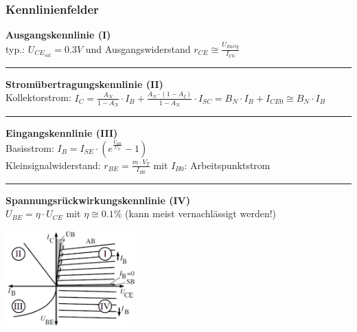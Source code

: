         \subsubsection{Kennlinienfelder}
            \begin{minipage}[T]{14cm}
                {\bf Ausgangskennlinie (I)}\\
                typ.: $U_{CE_{sat}}=0.3V$ und Ausgangswiderstand $r_{CE} \cong \frac{U_{Early}}{I_{C0}}$\\
                \hrule\vspace{1mm}
                {\bf Strom\"ubertragungskennlinie (II)}\\
                Kollektorstrom: $I_C = \frac{A_N}{1-A_N}\cdot I_B + \frac{A_N\cdot (1-A_I)}{1-A_N}\cdot I_{SC} = B_N\cdot I_B + I_{CE0} \cong B_N\cdot I_B$\\
                \hrule\vspace{1mm}
                {\bf Eingangskennlinie (III)}\\
                Basisstrom: $I_B = I_{SE}\cdot\left(e^{\frac{V_{BE}}{U_T}}-1\right)$\\
                Kleinsignalwiderstand: $r_{BE} = \frac{m\cdot V_T}{I_{B0}}$ mit $I_{B0}$: Arbeitspunktstrom\\
                \hrule\vspace{1mm}
                {\bf Spannungsr\"uckwirkungskennlinie (IV)}\\
                $U_{BE} = \eta \cdot U_{CE}$ mit $\eta \cong 0.1 \%$ (kann meist vernachl\"assigt werden!)\\
            \end{minipage}
            \begin{minipage}[T]{5cm}
                \includegraphics[width=5cm]{./bilder/BipTraKennlinien.png}
            \end{minipage}
\newpage

